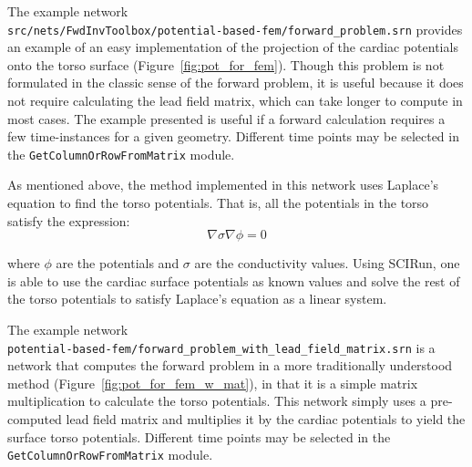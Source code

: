The example network\\
{\tt src/nets/FwdInvToolbox/potential-based-fem/forward\_problem.srn} provides an example of an easy implementation of the projection of the cardiac potentials onto the torso surface (Figure~\ref{fig:pot_for_fem}). Though this problem is not formulated in the classic sense of the forward problem, it is useful because it does not require calculating the lead field matrix, which can take longer to compute in most cases. The example presented is useful if a forward calculation requires a few time-instances for a given geometry. Different time points may be selected in the {\tt GetColumnOrRowFromMatrix} module.

As mentioned above, the method implemented in this network uses Laplace's equation to find the torso potentials. That is, all the potentials in the torso satisfy the expression:
\begin{equation*}
\nabla \sigma \nabla \phi = 0
\end{equation*}

\noindent where $\phi$ are the potentials and $\sigma$ are the conductivity values. Using SCIRun, one is able to use the cardiac surface potentials as known values and solve the rest of the torso potentials to satisfy Laplace's equation as a linear system.

The example network\\
{\tt potential-based-fem/forward\_problem\_with\_lead\_field\_matrix.srn} is a network that computes the forward problem in a more traditionally understood method (Figure~\ref{fig:pot_for_fem_w_mat}), in that it is a simple matrix multiplication to calculate the torso potentials. This network simply uses a pre-computed lead field matrix and multiplies it by the cardiac potentials to yield the surface torso potentials. Different time points may be selected in the {\tt GetColumnOrRowFromMatrix} module.

